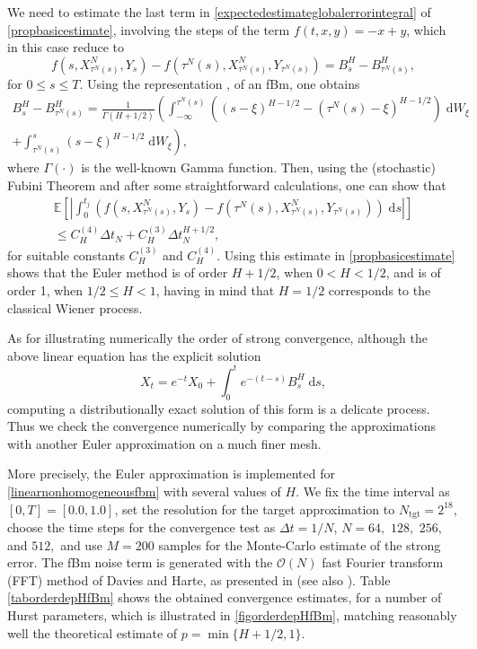 \documentclass[reqno,12pt]{amsart}
\theoremstyle{plain} %
\theoremstyle{definition} %
\begin{document}
We need to estimate the last term in \eqref{expectedestimateglobalerrorintegral} of \cref{propbasicestimate}, involving the steps of the term $f(t, x, y) = -x + y$, which in this case reduce to
\begin{equation}
    \label{stepfBm}
    f(s, X_{\tau^N(s)}^N, Y_s) - f(\tau^N(s), X_{\tau^N(s)}^N, Y_{\tau^N(s)}) = B^H_s - B^H_{\tau^N(s)},
\end{equation}
for $0 \leq s \leq T$. Using the representation \cite[eq. (2.1)]{MandelbrotVanNess1968}, \cite[eq. (1.1)]{BHOB2008} of an fBm, one obtains
\begin{multline}
    \label{BHtintegralformulastep}
    B^H_s - B^H_{\tau^N(s)} = \frac{1}{\Gamma(H + 1/2)}\left(\int_{-\infty}^{\tau^N(s)} \left( (s-\xi)^{H-1/2} - (\tau^N(s)-\xi)^{H-1/2}\right) \;\mathrm{d}W_\xi \right. \\
    \left. + \int_{\tau^N(s)}^s (s - \xi)^{H-1/2} \;\mathrm{d}W_\xi\right),
\end{multline}
where $\Gamma(\cdot)$ is the well-known Gamma function. Then, using the (stochastic) Fubini Theorem and after some straightforward calculations, one can show that
\begin{multline}
    \mathbb{E}\left[\left|\int_0^{t_j} \left( f(s, X_{\tau^N(s)}^N, Y_s) - f(\tau^N(s), X_{\tau^N(s)}^N, Y_{\tau^N(s)}) \right)\;\mathrm{d}s\right|\right] \\
    \leq C_H^{(4)} \Delta t_N + C_H^{(3)} \Delta t_N^{H + 1/2},
\end{multline}
for suitable constants $C_H^{(3)}$ and $C_H^{(4)}$. Using this estimate in \cref{propbasicestimate} shows that the Euler method is of order $H + 1/2$, when $0 < H < 1/2$, and is of order 1, when $1/2 \leq H < 1$, having in mind that $H=1/2$ corresponds to the classical Wiener process.

As for illustrating numerically the order of strong convergence, although the above linear equation has the explicit solution
\begin{equation}
    X_t = e^{-t}X_0 + \int_0^t e^{-(t-s)}B^H_s\;\mathrm{d}s,
\end{equation}
computing a distributionally exact solution of this form is a delicate process. Thus we check the convergence numerically by comparing the approximations with another Euler approximation on a much finer mesh.

More precisely, the Euler approximation is implemented for \eqref{linearnonhomogeneousfbm} with several values of $H$. We fix the time interval as $[0, T] = [0.0, 1.0]$, set the resolution for the target approximation to $N_{\textrm{tgt}} = 2^{18}$, choose the time steps for the convergence test as $\Delta t = 1/N$,  $N = 64,$ $128,$ $256,$ and $512,$ and use $M = 200$ samples for the Monte-Carlo estimate of the strong error. The fBm noise term is generated with the $\mathcal{O}(N)$ fast Fourier transform (FFT) method of Davies and Harte, as presented in \cite{DiekerMandjes2003} (see also \cite[Section 14.4]{HanKloeden2017}). Table \ref{taborderdepHfBm} shows the obtained convergence estimates, for a number of Hurst parameters, which is illustrated in \cref{figorderdepHfBm}, matching reasonably well the theoretical estimate of $p = \min\{H+1/2, 1\}.$
\end{document}

